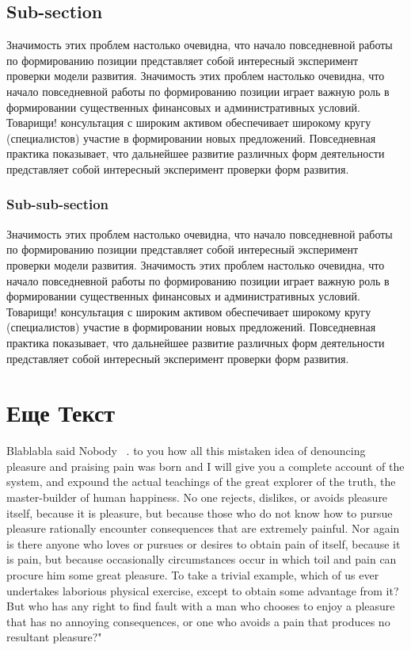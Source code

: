 \documentclass[a4paper,14pt]{extarticle}
\begin{document}
\subsection{Sub-section}
Значимость этих проблем настолько очевидна, что начало повседневной работы по формированию позиции представляет собой интересный эксперимент проверки модели развития. Значимость этих проблем настолько очевидна, что начало повседневной работы по формированию позиции играет важную роль в формировании существенных финансовых и административных условий. Товарищи! консультация с широким активом обеспечивает широкому кругу (специалистов) участие в формировании новых предложений. Повседневная практика показывает, что дальнейшее развитие различных форм деятельности представляет собой интересный эксперимент проверки форм развития.
\subsubsection{Sub-sub-section}
Значимость этих проблем настолько очевидна, что начало повседневной работы по формированию позиции представляет собой интересный эксперимент проверки модели развития. Значимость этих проблем настолько очевидна, что начало повседневной работы по формированию позиции играет важную роль в формировании существенных финансовых и административных условий. Товарищи! консультация с широким активом обеспечивает широкому кругу (специалистов) участие в формировании новых предложений. Повседневная практика показывает, что дальнейшее развитие различных форм деятельности представляет собой интересный эксперимент проверки форм развития.
\section{Еще Текст}
Blablabla said Nobody ~\cite{einstein}. to you how all this mistaken idea of denouncing pleasure and praising pain was born and I will give you a complete account of the system, and expound the actual teachings of the great explorer of the truth, the master-builder of human happiness. No one rejects, dislikes, or avoids pleasure itself, because it is pleasure, but because those who do not know how to pursue pleasure rationally encounter consequences that are extremely painful. Nor again is there anyone who loves or pursues or desires to obtain pain of itself, because it is pain, but because occasionally circumstances occur in which toil and pain can procure him some great pleasure. To take a trivial example, which of us ever undertakes laborious physical exercise, except to obtain some advantage from it? But who has any right to find fault with a man who chooses to enjoy a pleasure that has no annoying consequences, or one who avoids a pain that produces no resultant pleasure?"

\clearpage

\end{document}
